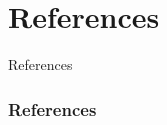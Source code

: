 \section{References}

\begin{frame}[c]
	\Huge{\centerline{References}}
\end{frame}

\begin{frame}[t,allowframebreaks]
	\frametitle{References}
	\printbibliography
\end{frame}